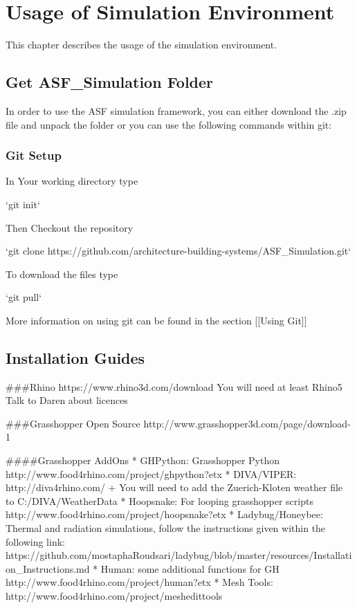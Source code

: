 
\chapter{Usage of Simulation Environment}\label{usage}

This chapter describes the usage of the simulation environment.

\section{Get ASF\_Simulation Folder}
	
	In order to use the ASF simulation framework, you can either download the .zip file and unpack the folder or you can use the following commands within git:

	\subsection{Git Setup}

	In Your working directory type

	`git init`

	Then Checkout the repository

	`git clone https://github.com/architecture-building-systems/ASF_Simulation.git`

	To download the files type

	`git pull`

	More information on using git can be found in the section [[Using Git]]

		
\section{Installation Guides}

	###Rhino
	https://www.rhino3d.com/download
	You will need at least Rhino5
	Talk to Daren about licences

	###Grasshopper
	Open Source
	http://www.grasshopper3d.com/page/download-1

	####Grasshopper AddOns
	* GHPython: Grasshopper Python http://www.food4rhino.com/project/ghpython?etx
	* DIVA/VIPER: http://diva4rhino.com/
	 + You will need to add the Zuerich-Kloten weather file to C:/DIVA/WeatherData
	* Hoopsnake: For looping grasshopper scripts http://www.food4rhino.com/project/hoopsnake?etx
	* Ladybug/Honeybee: Thermal and radiation simulations, follow the instructions given within the following link: https://github.com/mostaphaRoudsari/ladybug/blob/master/resources/Installation_Instructions.md
	* Human: some additional functions for GH http://www.food4rhino.com/project/human?etx
	* Mesh Tools: http://www.food4rhino.com/project/meshedittools


